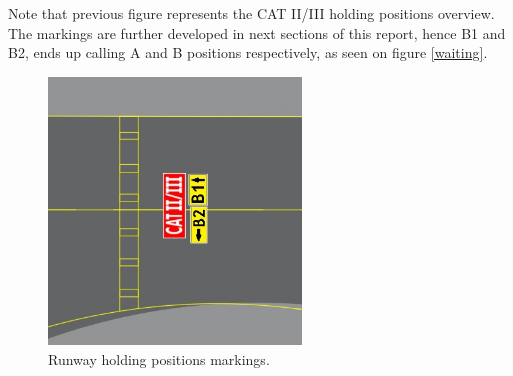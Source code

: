 	Note that previous figure represents the CAT II/III holding positions overview. The markings are further developed in next sections of this report, hence B1 and B2, ends up calling A and B positions respectively, as seen on figure \ref{waiting}. 

	\begin{figure}[H]
	\centering
	\includegraphics[clip, trim=0cm 0cm 0cm 0cm, width=0.6\textwidth]{./images/holding/cartell}
	\caption{Runway holding positions markings.}
	\label{cartell}
	\end{figure}

